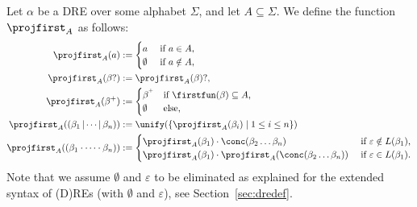 \documentclass[a4paper,11pt, svgnames,titlepage]{article}
\newcommand{\rxp}{{^\mathtt{+}}}
\newcommand{\rxo}{\mathtt{?}}
\newcommand{\rxc}{\cdot}
\DeclareMathOperator{\ror}{\mathtt{|}}
\newcommand{\emptyword}{\varepsilon}
\newcommand{\df}{:=}
\begin{document}
Let $\alpha$ be a DRE over some alphabet $\Sigma$, and let $A\subseteq \Sigma$. We define the function $\projfirst_A$ as follows:
\begin{align*}
	\projfirst_A(a)&\df 
		\begin{cases}
			a & \text{ if $a\in A$,}\\
			\emptyset & \text{ if $a\notin A$,}
		\end{cases}\\
	\projfirst_A(\beta\rxo)&\df \projfirst_A(\beta)\rxo,\\
	\projfirst_A(\beta\rxp)&\df 
		\begin{cases}
			\beta^\rxp & \text{if $\firstfun(\beta)\subseteq A$,}\\
			\emptyset  & \text{else,}
		\end{cases}\\
	\projfirst_{A}((\beta_1\ror\cdots\ror\beta_n))&\df \unify(\{\projfirst_A(\beta_i)\mid 1\leq i \leq n\})\\
	\projfirst_{A}((\beta_1\rxc\cdots\rxc\beta_n))&\df
		\begin{cases}
			\projfirst_{A}(\beta_1)\rxc\conc(\beta_2\ldots\beta_n) & \text{ if $\emptyword\notin L(\beta_1)$,}\\
			\projfirst_{A}(\beta_1)\rxc\projfirst_{A}(\conc(\beta_2\ldots\beta_n)) & \text{ if $\emptyword\in L(\beta_1)$}.
		\end{cases}
\end{align*}
Note that we assume $\emptyset$ and $\emptyword$ to be eliminated as explained for the  extended syntax of (D)REs (with $\emptyset$ and $\emptyword$), see Section~\ref{sec:dredef}.
\end{document}
